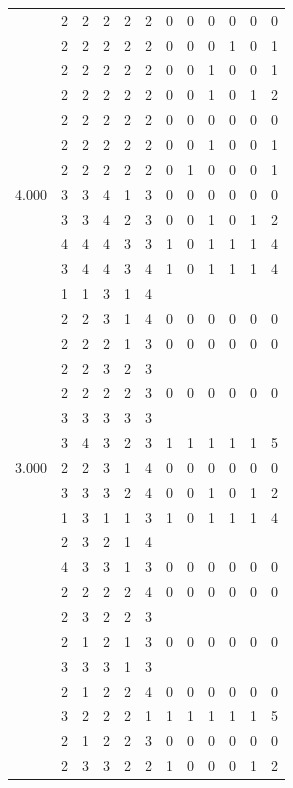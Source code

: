 \documentclass[]{msu-thesis}
\theoremstyle{definition}
\theoremstyle{definition}
\theoremstyle{definition}
\theoremstyle{remark}
\begin{document}
\begin{table}
{\begin{tabular}[t]{rrrrrrrrrrrr}
 & 2 & 2 & 2 & 2 & 2 & 0 & 0 & 0 & 0 & 0 & 0\\
 & 2 & 2 & 2 & 2 & 2 & 0 & 0 & 0 & 1 & 0 & 1\\
 & 2 & 2 & 2 & 2 & 2 & 0 & 0 & 1 & 0 & 0 & 1\\
 & 2 & 2 & 2 & 2 & 2 & 0 & 0 & 1 & 0 & 1 & 2\\
 & 2 & 2 & 2 & 2 & 2 & 0 & 0 & 0 & 0 & 0 & 0\\
 & 2 & 2 & 2 & 2 & 2 & 0 & 0 & 1 & 0 & 0 & 1\\
 & 2 & 2 & 2 & 2 & 2 & 0 & 1 & 0 & 0 & 0 & 1\\
4.000 & 3 & 3 & 4 & 1 & 3 & 0 & 0 & 0 & 0 & 0 & 0\\
 & 3 & 3 & 4 & 2 & 3 & 0 & 0 & 1 & 0 & 1 & 2\\
 & 4 & 4 & 4 & 3 & 3 & 1 & 0 & 1 & 1 & 1 & 4\\
 & 3 & 4 & 4 & 3 & 4 & 1 & 0 & 1 & 1 & 1 & 4\\
 & 1 & 1 & 3 & 1 & 4 &  &  &  &  &  & \\
 & 2 & 2 & 3 & 1 & 4 & 0 & 0 & 0 & 0 & 0 & 0\\
 & 2 & 2 & 2 & 1 & 3 & 0 & 0 & 0 & 0 & 0 & 0\\
 & 2 & 2 & 3 & 2 & 3 &  &  &  &  &  & \\
 & 2 & 2 & 2 & 2 & 3 & 0 & 0 & 0 & 0 & 0 & 0\\
 & 3 & 3 & 3 & 3 & 3 &  &  &  &  &  & \\
 & 3 & 4 & 3 & 2 & 3 & 1 & 1 & 1 & 1 & 1 & 5\\
3.000 & 2 & 2 & 3 & 1 & 4 & 0 & 0 & 0 & 0 & 0 & 0\\
 & 3 & 3 & 3 & 2 & 4 & 0 & 0 & 1 & 0 & 1 & 2\\
 & 1 & 3 & 1 & 1 & 3 & 1 & 0 & 1 & 1 & 1 & 4\\
 & 2 & 3 & 2 & 1 & 4 &  &  &  &  &  & \\
 & 4 & 3 & 3 & 1 & 3 & 0 & 0 & 0 & 0 & 0 & 0\\
 & 2 & 2 & 2 & 2 & 4 & 0 & 0 & 0 & 0 & 0 & 0\\
 & 2 & 3 & 2 & 2 & 3 &  &  &  &  &  & \\
 & 2 & 1 & 2 & 1 & 3 & 0 & 0 & 0 & 0 & 0 & 0\\
 & 3 & 3 & 3 & 1 & 3 &  &  &  &  &  & \\
 & 2 & 1 & 2 & 2 & 4 & 0 & 0 & 0 & 0 & 0 & 0\\
 & 3 & 2 & 2 & 2 & 1 & 1 & 1 & 1 & 1 & 1 & 5\\
 & 2 & 1 & 2 & 2 & 3 & 0 & 0 & 0 & 0 & 0 & 0\\
 & 2 & 3 & 3 & 2 & 2 & 1 & 0 & 0 & 0 & 1 & 2\\

\end{tabular}}
\end{table}
\end{document}
